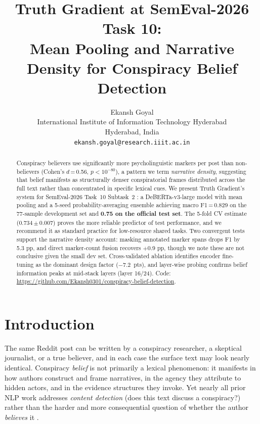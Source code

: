 \documentclass[11pt]{article}
\title{Truth Gradient at SemEval-2026 Task 10:\\
Mean Pooling and Narrative Density for Conspiracy Belief Detection}
\author{Ekansh Goyal \\
  International Institute of Information Technology Hyderabad \\
  Hyderabad, India \\
  \texttt{ekansh.goyal@research.iiit.ac.in}}
\begin{document}
\maketitle

\begin{abstract}
Conspiracy believers use significantly more psycholinguistic markers per post than non-believers (Cohen's $d$\,=\,0.56, $p < 10^{-80}$), a pattern we term \emph{narrative density}, suggesting that belief manifests as structurally denser conspiratorial frames distributed across the full text rather than concentrated in specific lexical cues.
We present Truth Gradient's system for SemEval-2026 Task~10 Subtask~2 \citep{samory-etal-2026-semeval}: a DeBERTa-v3-large model with mean pooling and a 5-seed probability-averaging ensemble achieving macro F1\,=\,0.829 on the 77-sample development set and \textbf{0.75 on the official test set}.
The 5-fold CV estimate (0.734\,$\pm$\,0.007) proves the more reliable predictor of test performance, and we recommend it as standard practice for low-resource shared tasks.
Two convergent tests support the narrative density account: masking annotated marker spans drops F1 by 5.3 pp, and direct marker-count fusion recovers $+$0.9 pp, though we note these are not conclusive given the small dev set.
Cross-validated ablation identifies encoder fine-tuning as the dominant design factor ($-$7.2~pts), and layer-wise probing confirms belief information peaks at mid-stack layers (layer 16/24).
Code: \url{https://github.com/Ekansh0301/conspiracy-belief-detection}.
\end{abstract}

\section{Introduction}
\label{sec:intro}

The same Reddit post can be written by a conspiracy researcher, a skeptical journalist, or a true believer, and in each case the surface text may look nearly identical.
Conspiracy \emph{belief} is not primarily a lexical phenomenon: it manifests in how authors construct and frame narratives, in the agency they attribute to hidden actors, and in the evidence structures they invoke.
Yet nearly all prior NLP work addresses \emph{content detection} (does this text discuss a conspiracy?) rather than the harder and more consequential question of whether the author \emph{believes} it \citep{miani2021loco,bessi2015science}.
\end{document}
